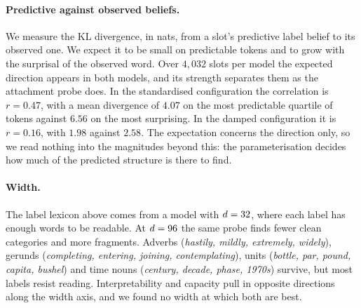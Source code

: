 \paragraph{Predictive against observed beliefs.}
We measure the KL divergence, in nats, from a slot's predictive label belief to its observed
one. We expect it to be small on
predictable tokens and to grow with the surprisal of the observed word. Over $4{,}032$ slots per
model the expected direction appears in both models, and its strength separates them as the
attachment probe does. In the standardised configuration the correlation is $r = 0.47$, with a
mean divergence of $4.07$ on the most predictable quartile of tokens against $6.56$ on the most
surprising. In the damped configuration it is $r = 0.16$, with $1.98$ against $2.58$. The
expectation concerns the direction only, so we read nothing into the magnitudes beyond this:
the parameterisation decides how much of the predicted structure is there to find.

\paragraph{Width.}
The label lexicon above comes from a model with $d=32$, where each label has enough words to
be readable. At $d=96$ the same probe finds fewer clean categories and more fragments.
Adverbs (\textit{hastily, mildly, extremely, widely}), gerunds (\textit{completing, entering,
joining, contemplating}), units (\textit{bottle, par, pound, capita, bushel}) and time nouns
(\textit{century, decade, phase, 1970s}) survive, but most labels resist reading.
Interpretability and capacity pull in opposite directions along the width axis, and we found no
width at which both are best.
